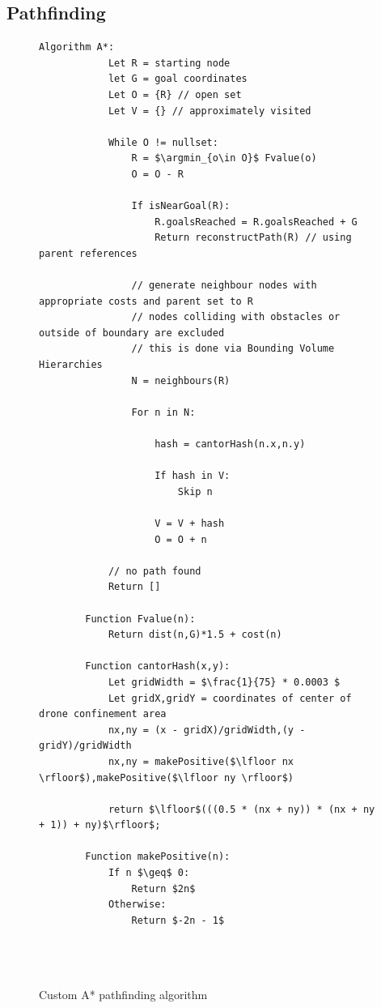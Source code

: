\documentclass[10pt,a4paper]{article}
\DeclareMathOperator*{\argmin}{arg\,min}
\begin{document}
\subsection{Pathfinding}
\begin{figure}[H]
    \begin{lstlisting}[style=mystyle]
        Algorithm A*:
            Let R = starting node
            let G = goal coordinates
            Let O = {R} // open set
            Let V = {} // approximately visited
            
            While O != nullset:
                R = $\argmin_{o\in O}$ Fvalue(o)
                O = O - R

                If isNearGoal(R):
                    R.goalsReached = R.goalsReached + G
                    Return reconstructPath(R) // using parent references

                // generate neighbour nodes with appropriate costs and parent set to R
                // nodes colliding with obstacles or outside of boundary are excluded
                // this is done via Bounding Volume Hierarchies
                N = neighbours(R) 

                For n in N:
                    
                    hash = cantorHash(n.x,n.y)

                    If hash in V:
                        Skip n
                    
                    V = V + hash
                    O = O + n
            
            // no path found
            Return []

        Function Fvalue(n):
            Return dist(n,G)*1.5 + cost(n)

        Function cantorHash(x,y):
            Let gridWidth = $\frac{1}{75} * 0.0003 $
            Let gridX,gridY = coordinates of center of drone confinement area 
            nx,ny = (x - gridX)/gridWidth,(y - gridY)/gridWidth
            nx,ny = makePositive($\lfloor nx \rfloor$),makePositive($\lfloor ny \rfloor$)

            return $\lfloor$(((0.5 * (nx + ny)) * (nx + ny + 1)) + ny)$\rfloor$;
        
        Function makePositive(n):
            If n $\geq$ 0:
                Return $2n$
            Otherwise:
                Return $-2n - 1$
               
            
            
    \end{lstlisting}
    \caption{Custom A* pathfinding algorithm}
    \label{alg:a*}
\end{figure}
\end{document}

